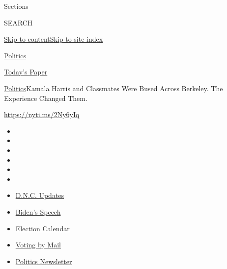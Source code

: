 Sections

SEARCH

\protect\hyperlink{site-content}{Skip to
content}\protect\hyperlink{site-index}{Skip to site index}

\href{https://www.nytimes3xbfgragh.onion/section/politics}{Politics}

\href{https://myaccount.nytimes3xbfgragh.onion/auth/login?response_type=cookie\&client_id=vi}{}

\href{https://www.nytimes3xbfgragh.onion/section/todayspaper}{Today's
Paper}

\href{/section/politics}{Politics}\textbar{}Kamala Harris and Classmates
Were Bused Across Berkeley. The Experience Changed Them.

\url{https://nyti.ms/2Ny6yIq}

\begin{itemize}
\item
\item
\item
\item
\item
\item
\end{itemize}

\begin{itemize}
\item
  \href{https://www.nytimes3xbfgragh.onion/live/2020/08/20/us/dnc-convention-election?action=click\&pgtype=Article\&state=default\&region=TOP_BANNER\&context=storylines_menu}{D.N.C.
  Updates}
\item
  \href{https://www.nytimes3xbfgragh.onion/2020/08/20/us/politics/biden-presidential-nomination-dnc.html?action=click\&pgtype=Article\&state=default\&region=TOP_BANNER\&context=storylines_menu}{Biden's
  Speech}
\item
  \href{https://www.nytimes3xbfgragh.onion/interactive/2019/us/elections/2020-presidential-election-calendar.html?action=click\&pgtype=Article\&state=default\&region=TOP_BANNER\&context=storylines_menu}{Election
  Calendar}
\item
  \href{https://www.nytimes3xbfgragh.onion/interactive/2020/08/11/us/politics/vote-by-mail-us-states.html?action=click\&pgtype=Article\&state=default\&region=TOP_BANNER\&context=storylines_menu}{Voting
  by Mail}
\item
  \href{https://www.nytimes3xbfgragh.onion/newsletters/politics?action=click\&pgtype=Article\&state=default\&region=TOP_BANNER\&context=storylines_menu}{Politics
  Newsletter}
\end{itemize}

